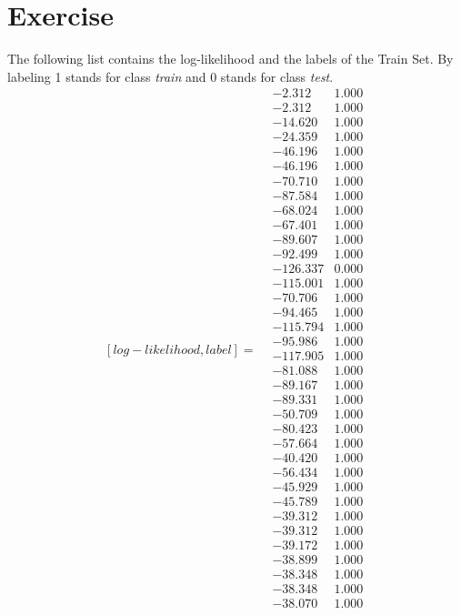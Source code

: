 \documentclass[conference]{IEEEtran}
\begin{document}
\section{Exercise}
The following list contains the log-likelihood and the labels of the Train Set. By labeling 1 stands for class \textit{train} and 0 stands for class \textit{test}.
$$
[log-likelihood, label] =
 \begin{smallmatrix}
 &-2.312 &1.000\\
 &-2.312 &1.000\\
 &-14.620 &1.000\\
 &-24.359 &1.000\\
 &-46.196 &1.000\\
 &-46.196 &1.000\\
 &-70.710 &1.000\\
 &-87.584 &1.000\\
 &-68.024 &1.000\\
 &-67.401 &1.000\\
 &-89.607 &1.000\\
 &-92.499 &1.000\\
 &-126.337 &0.000\\
 &-115.001 &1.000\\
 &-70.706 &1.000\\
 &-94.465 &1.000\\
 &-115.794 &1.000\\
 &-95.986 &1.000\\
 &-117.905 &1.000\\
 &-81.088 &1.000\\
 &-89.167 &1.000\\
 &-89.331 &1.000\\
 &-50.709 &1.000\\
 &-80.423 &1.000\\
 &-57.664 &1.000\\
 &-40.420 &1.000\\
 &-56.434 &1.000\\
 &-45.929 &1.000\\
 &-45.789 &1.000\\
 &-39.312 &1.000\\
 &-39.312 &1.000\\
 &-39.172 &1.000\\
 &-38.899 &1.000\\
 &-38.348 &1.000\\
 &-38.348 &1.000\\
 &-38.070 &1.000\\

\end{smallmatrix}$$
\end{document}
